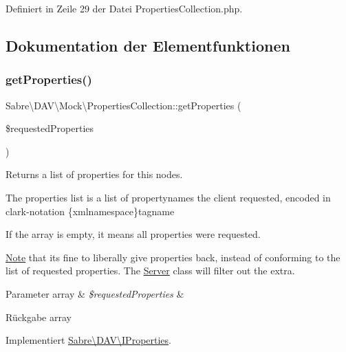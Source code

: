 Definiert in Zeile 29 der Datei Properties\+Collection.\+php.



\subsection{Dokumentation der Elementfunktionen}
\mbox{\label{class_sabre_1_1_d_a_v_1_1_mock_1_1_properties_collection_a28e9b64c14a61b61a3ab8c7a4443d362}} 
\subsubsection{\texorpdfstring{get\+Properties()}{getProperties()}}
{\footnotesize\ttfamily Sabre\textbackslash{}\+D\+A\+V\textbackslash{}\+Mock\textbackslash{}\+Properties\+Collection\+::get\+Properties (\begin{DoxyParamCaption}\item[{}]{\$requested\+Properties }\end{DoxyParamCaption})}

Returns a list of properties for this nodes.

The properties list is a list of propertynames the client requested, encoded in clark-\/notation \{xmlnamespace\}tagname

If the array is empty, it means \textquotesingle{}all properties\textquotesingle{} were requested.

\mbox{\hyperlink{class_note}{Note}} that it\textquotesingle{}s fine to liberally give properties back, instead of conforming to the list of requested properties. The \mbox{\hyperlink{class_sabre_1_1_d_a_v_1_1_server}{Server}} class will filter out the extra.


\begin{DoxyParams}[1]{Parameter}
array & {\em \$requested\+Properties} & \\
\hline
\end{DoxyParams}
\begin{DoxyReturn}{Rückgabe}
array 
\end{DoxyReturn}


Implementiert \mbox{\hyperlink{interface_sabre_1_1_d_a_v_1_1_i_properties_a0d2fcaacf74daaa5cf24ea53a057140a}{Sabre\textbackslash{}\+D\+A\+V\textbackslash{}\+I\+Properties}}.



